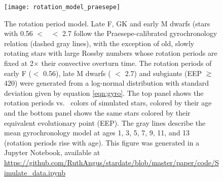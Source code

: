 \begin{figure}
  \caption{
The rotation period model.
    Late F, GK and early M dwarfs (stars with 0.56 $<$ \gcolor\ $<$ 2.7 follow
    the Praesepe-calibrated gyrochronology relation (dashed gray lines), with
    the exception of old, slowly
    rotating stars with large Rossby numbers whose rotation periods are fixed
    at 2$\times$ their convective overturn time.
    The rotation periods of early F (\gcolor $<$ 0.56), late M dwarfs (\gcolor
    $<$ 2.7) and subgiants (EEP $\gtrsim$ 420) were generated
    from a log-normal distribution with standard deviation given by equation
    \ref{eqn:gyro}.
The top panel shows the rotation periods vs. \gcolor\ colors of simulated stars,
    colored by their age and the bottom panel shows the same stars colored
    by their equivalent evolutionary point (EEP).
    The gray lines describe the mean gyrochronology model at ages 1,
    3, 5, 7, 9, 11, and 13 (rotation periods rise with age).
    This figure was generated in a Jupyter Notebook, available at
    \url{https://github.com/RuthAngus/stardate/blob/master/paper/code/Simulate_data.ipynb}
}
  \centering
    \texttt{[image: rotation\_model\_praesepe]}
\label{fig:rotation_model}
\end{figure}

